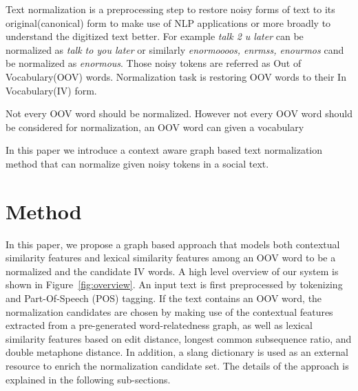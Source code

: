 \documentclass[preprint,review,12pt]{elsarticle}
\begin{document}
Text normalization is a preprocessing step to restore noisy forms of text to its original(canonical) form\cite{Han:2011:LNS:2002472.2002520} to make use of NLP applications or more broadly to understand the digitized text better. For example \textit{talk 2 u later} can be normalized as \textit{talk to you later} or similarly \textit{enormoooos, enrmss, enourmos} cand be normalized as \textit{enormous}. Those noisy tokens are referred as Out of Vocabulary(OOV) words. Normalization task is restoring OOV words to their In Vocabulary(IV) form.

Not every OOV word should be normalized\cite{DBLP:conf/acl/HassanM13}.
However not every OOV word should be considered for normalization, an OOV word can given a vocabulary


In this paper we introduce a context aware graph based text normalization method that can normalize given noisy tokens in a social text.

\section{Method}
\label{sec:graph}



In this paper, we propose a graph based approach that models both contextual similarity features and lexical similarity features among an OOV word to be a normalized and the candidate IV words. A high level overview of our system is shown in Figure~\ref{fig:overview}. An input text is first preprocessed by tokenizing and Part-Of-Speech (POS) tagging. If the text contains an OOV word, the normalization candidates are chosen by making use of the contextual features extracted from a pre-generated word-relatedness graph, as well as lexical similarity features based on edit distance, longest common subsequence ratio, and double metaphone distance. In addition, a slang dictionary is used as an external resource to enrich the normalization candidate set. The details of the approach is explained in the following sub-sections.
\end{document}
